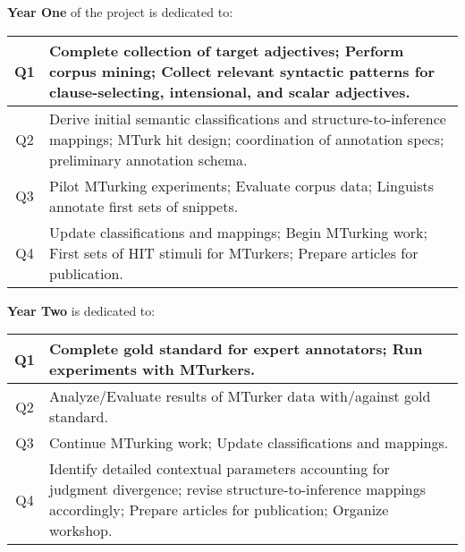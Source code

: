 \documentclass[10pt]{article}
\newcommand{\miniskip}{\vspace*{1mm}}
\begin{document}
 
{\bf Year One} of the project is dedicated to: 

\vspace{1mm}\noindent
{\small
\begin{tabularx}{470pt}{|c|X|}

\hline

Q1 & Complete collection of target adjectives; Perform corpus mining;  Collect relevant syntactic patterns for clause-selecting, intensional, and scalar adjectives. 
\\
\hline

Q2 & Derive initial semantic classifications and structure-to-inference mappings; MTurk hit design; coordination of annotation specs; preliminary annotation schema.
 \\

\hline

Q3 & Pilot MTurking experiments;  Evaluate corpus data; Linguists annotate first sets of snippets.    \\
 
\hline

Q4 & Update classifications and mappings; Begin MTurking work; First sets of HIT stimuli for MTurkers; Prepare articles for publication.     \\

\hline

\end{tabularx}
}

\miniskip\noindent
{\bf Year Two} is dedicated to: 

\vspace{2mm}\noindent
{\small
\begin{tabularx}{470pt}{|c|X|}

\hline

Q1 	&  Complete gold standard for expert annotators; Run experiments with MTurkers. \\

\hline

Q2	& Analyze/Evaluate results of MTurker data with/against gold standard. \\

\hline

Q3	&  Continue MTurking work; Update classifications and mappings. \\

\hline

Q4	& Identify detailed contextual parameters accounting for judgment divergence; revise structure-to-inference mappings accordingly; Prepare articles for
       publication;  Organize workshop. \\
\hline

\end{tabularx}
}
\end{document}
